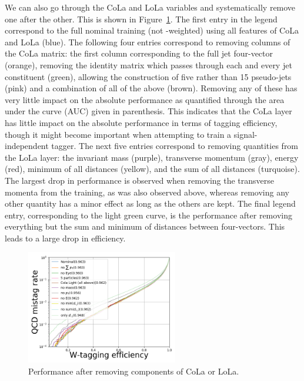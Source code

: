 We can also go through the CoLa and LoLa variables and systematically remove one after the other. This is shown in Figure~\ref{fig:lola:nminus1}. The first entry in the legend correspond to the full nominal training (not \PT-weighted) using all features of CoLa and LoLa (blue). The following four entries correspond to removing columns of the CoLa matrix: the first column corresponding to the full jet four-vector (orange), removing the identity matrix which passes through each and every jet constituent (green), allowing the construction of five rather than 15 pseudo-jets (pink) and a combination of all of the above (brown). Removing any of these has very little impact on the absolute performance as quantified through the area under the curve (AUC) given in parenthesis. This indicates that the CoLa layer has little impact on the absolute performance in terms of tagging efficiency, though it might become important when attempting to train a signal-independent tagger. The next five entries correspond to removing quantities from the LoLa layer: the invariant mass (purple), transverse momentum (gray), energy (red), minimum of all distances (yellow), and the sum of all distances (turquoise). The largest drop in performance is observed when removing the transverse momenta from the training, as was also observed above, whereas removing any other quantity has a minor effect as long as the others are kept. The final legend entry, corresponding to the light green curve, is the performance after removing everything but the sum and minimum of distances between four-vectors. This leads to a large drop in efficiency.
\begin{figure}[h!]
\centering
\includegraphics[width=0.59\textwidth]{figures/vtagging/AN-18-099/input/ROC_Nminus1.png}
\caption{Performance after removing components of CoLa or LoLa.}
\label{fig:lola:nminus1}
\end{figure}

